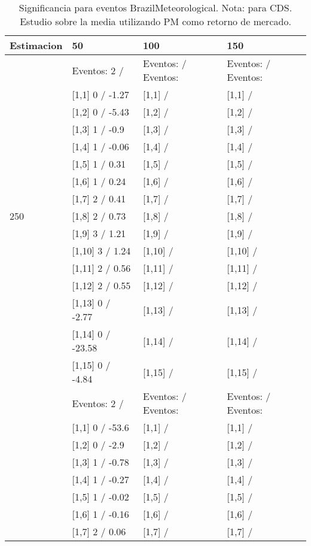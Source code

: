 \begin{table}

\caption{Significancia para eventos BrazilMeteorological. Nota: para CDS. Estudio sobre la media utilizando PM como retorno de mercado.}
\centering
\begin{tabular}[t]{llll}
\toprule
Estimacion & 50 & 100 & 150\\
\midrule
 & Eventos:  2 / & Eventos:   / Eventos: & Eventos:   / Eventos:\\
 & {}[1,1] 0  / -1.27 & {}[1,1]  / & {}[1,1]  /\\
 & {}[1,2] 0  / -5.43 & {}[1,2]  / & {}[1,2]  /\\
 & {}[1,3] 1  / -0.9 & {}[1,3]  / & {}[1,3]  /\\
 & {}[1,4] 1  / -0.06 & {}[1,4]  / & {}[1,4]  /\\
\addlinespace
 & {}[1,5] 1  / 0.31 & {}[1,5]  / & {}[1,5]  /\\
 & {}[1,6] 1  / 0.24 & {}[1,6]  / & {}[1,6]  /\\
 & {}[1,7] 2  / 0.41 & {}[1,7]  / & {}[1,7]  /\\
250 & {}[1,8] 2  / 0.73 & {}[1,8]  / & {}[1,8]  /\\
 & {}[1,9] 3  / 1.21 & {}[1,9]  / & {}[1,9]  /\\
\addlinespace
 & {}[1,10] 3  / 1.24 & {}[1,10]  / & {}[1,10]  /\\
 & {}[1,11] 2  / 0.56 & {}[1,11]  / & {}[1,11]  /\\
 & {}[1,12] 2  / 0.55 & {}[1,12]  / & {}[1,12]  /\\
 & {}[1,13] 0  / -2.77 & {}[1,13]  / & {}[1,13]  /\\
 & {}[1,14] 0  / -23.58 & {}[1,14]  / & {}[1,14]  /\\
\addlinespace
 & {}[1,15] 0  / -4.84 & {}[1,15]  / & {}[1,15]  /\\
 & Eventos:  2 / & Eventos:   / Eventos: & Eventos:   / Eventos:\\
 & {}[1,1] 0  / -53.6 & {}[1,1]  / & {}[1,1]  /\\
 & {}[1,2] 0  / -2.9 & {}[1,2]  / & {}[1,2]  /\\
 & {}[1,3] 1  / -0.78 & {}[1,3]  / & {}[1,3]  /\\
\addlinespace
 & {}[1,4] 1  / -0.27 & {}[1,4]  / & {}[1,4]  /\\
 & {}[1,5] 1  / -0.02 & {}[1,5]  / & {}[1,5]  /\\
 & {}[1,6] 1  / -0.16 & {}[1,6]  / & {}[1,6]  /\\
 & {}[1,7] 2  / 0.06 & {}[1,7]  / & {}[1,7]  /\\

\end{tabular}
\end{table}
